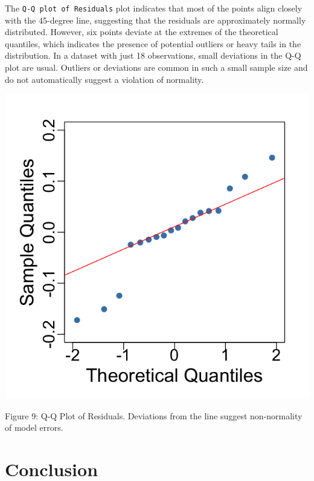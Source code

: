 \documentclass[
  12pt,
]{article}
\begin{document}
\begin{minipage}{0.65\textwidth}
\justifying

The \texttt{Q-Q plot of Residuals} plot indicates that most of the points align closely with the 45-degree line, suggesting that the residuals are approximately normally distributed. However, six points deviate at the extremes of the theoretical quantiles, which indicates the presence of potential outliers or heavy tails in the distribution. In a dataset with just 18 observations, small deviations in the Q-Q plot are usual. Outliers or deviations are common in such a small sample size and do not automatically suggest a violation of normality.
\end{minipage}
\hfill
\begin{minipage}{0.33\textwidth}
\centering
\vspace{-2em}  %
\includegraphics[width=0.9\linewidth]{figures/qqplot_residuals.png}
\vspace{-1em}
\parbox{\linewidth}{\fontsize{12}{14}\selectfont Figure 9: Q-Q Plot of Residuals. Deviations from the line suggest non-normality of model errors.}

\end{minipage}

\section{Conclusion}\label{conclusion}
\end{document}

